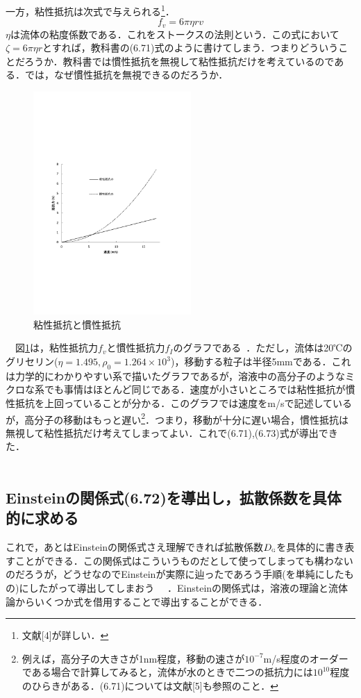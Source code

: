 \documentclass{jsarticle}
\begin{document}
一方，粘性抵抗は次式で与えられる\footnote{文献[4]が詳しい．}．
\begin{equation}
f_v = 6\pi \eta rv
\end{equation}
$\eta$は流体の粘度係数である．これをストークスの法則という．この式において$\zeta=6\pi \eta r$とすれば，教科書の(6.71)式のように書けてしまう．つまりどういうことだろうか．教科書では慣性抵抗を無視して粘性抵抗だけを考えているのである．では，なぜ慣性抵抗を無視できるのだろうか．
\begin{figure}
  \vspace*{-\intextsep}
  \includegraphics[width=6cm]{s-粘性抵抗と慣性抵抗.pdf}
  \caption{粘性抵抗と慣性抵抗}
  \label{fig.抵抗}
\end{figure}
　図\ref{fig.抵抗}は，粘性抵抗力$f_v$と慣性抵抗力$f_I$のグラフである~\cite{藤原}．ただし，流体は20℃のグリセリン($\eta=1.495,\rho _0=1.264×10^3$)，移動する粒子は半径5mmである．これは力学的にわかりやすい系で描いたグラフであるが，溶液中の高分子のようなミクロな系でも事情はほとんど同じである．速度が小さいところでは粘性抵抗が慣性抵抗を上回っていることが分かる．このグラフでは速度をm/sで記述しているが，高分子の移動はもっと遅い\footnote{例えば，高分子の大きさが1nm程度，移動の速さが$10^{-7}$m/s程度のオーダーである場合で計算してみると，流体が水のときで二つの抵抗力には$10^{10}$程度のひらきがある．(6.71)については文献[5]も参照のこと．}．つまり，移動が十分に遅い場合，慣性抵抗は無視して粘性抵抗だけ考えてしまってよい．これで(6.71),(6.73)式が導出できた．\\
\\




\subsection{Einsteinの関係式(6.72)を導出し，拡散係数を具体的に求める}
これで，あとはEinsteinの関係式さえ理解できれば拡散係数$D_{\scalebox{0.5}{G}}$を具体的に書き表すことができる．この関係式はこういうものだとして使ってしまっても構わないのだろうが，どうせなのでEinsteinが実際に辿ったであろう手順(を単純にしたもの)にしたがって導出してしまおう~\cite{米沢} ~\cite{アイン}．Einsteinの関係式は，溶液の理論と流体論からいくつか式を借用することで導出することができる．
\end{document}
